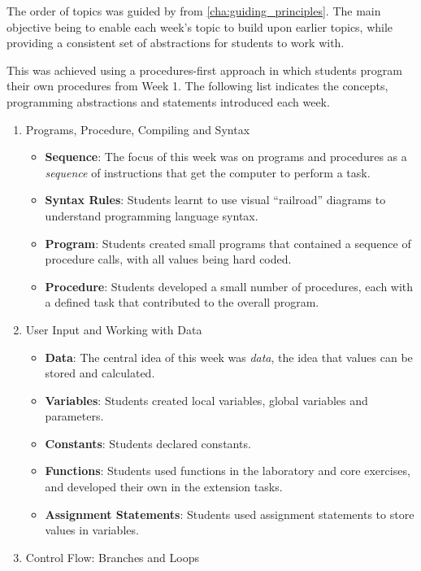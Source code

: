 The order of topics was guided by  from \cref{cha:guiding_principles}. The main objective being to enable each week's topic to build upon earlier topics, while providing a consistent set of abstractions for students to work with.

This was achieved using a procedures-first approach in which students program their own procedures from Week 1. The following list indicates the concepts, programming abstractions and statements introduced each week.

\begin{enumerate}
  \item Programs, Procedure, Compiling and Syntax
  \begin{itemize}[noitemsep,nolistsep]
  	\item \textbf{Sequence}: The focus of this week was on programs and procedures as a \emph{sequence} of instructions that get the computer to perform a task.
  	\item \textbf{Syntax Rules}: Students learnt to use visual ``railroad'' diagrams \cite{Braz:1990} to understand programming language syntax.
  	\item \textbf{Program}: Students created small programs that contained a sequence of procedure calls, with all values being hard coded.
  	\item \textbf{Procedure}: Students developed a small number of procedures, each with a defined task that contributed to the overall program.
  \end{itemize}
  \item User Input and Working with Data
  \begin{itemize}[noitemsep,nolistsep]
  	\item \textbf{Data}: The central idea of this week was \emph{data}, the idea that values can be stored and calculated.
  	\item \textbf{Variables}: Students created local variables, global variables and parameters.
  	\item \textbf{Constants}: Students declared constants.
  	\item \textbf{Functions}: Students used functions in the laboratory and core exercises, and developed their own in the extension tasks.
  	\item \textbf{Assignment Statements}: Students used assignment statements to store values in variables. 
  \end{itemize}
  \item Control Flow: Branches and Loops

\end{enumerate}

